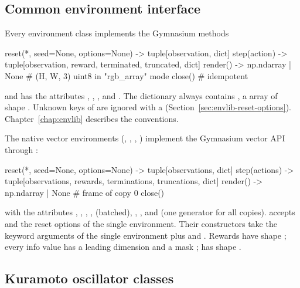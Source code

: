 \subsection{Common environment interface}

Every environment class implements the Gymnasium methods

\begin{pycode}
reset(*, seed=None, options=None) -> tuple[observation, dict]
step(action) -> tuple[observation, reward, terminated, truncated, dict]
render() -> np.ndarray | None        # (H, W, 3) uint8 in "rgb_array" mode
close()                              # idempotent
\end{pycode}

and has the attributes , ,
,  and . The 
dictionary always contains , a  array of
shape . Unknown keys of  are ignored with a
 (Section~\ref{sec:envlib-reset-options}).
Chapter~\ref{chap:envlib} describes the conventions.

The native vector environments (,
, , )
implement the Gymnasium vector API through :

\begin{pycode}
reset(*, seed=None, options=None) -> tuple[observations, dict]
step(actions) -> tuple[observations, rewards, terminations, truncations, dict]
render() -> np.ndarray | None        # frame of copy 0
close()
\end{pycode}

with the attributes , ,
, , 
(batched), , ,  and
 (one generator for all copies).  accepts
 and the reset options of the single environment. Their
constructors take the keyword arguments of the single environment plus
 and . Rewards have shape
; every info value has a leading  dimension
and a mask ;  has shape
.

\subsection{Kuramoto oscillator classes}

